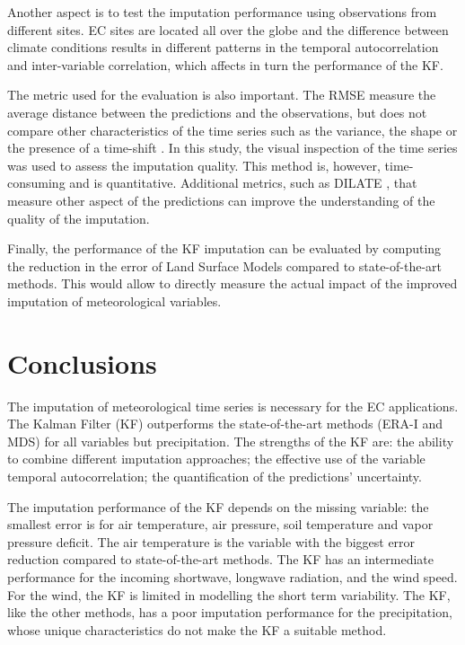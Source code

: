 \documentclass{article}
\let\Oldsection\section
\renewcommand{\section}{\FloatBarrier\Oldsection}
\begin{document}
Another aspect is to test the imputation performance using observations from different sites. EC sites are located all over the globe \cite{pastorello_fluxnet2015_2020} and the difference between climate conditions results in different patterns in the temporal autocorrelation and inter-variable correlation, which affects in turn the performance of the KF.

The metric used for the evaluation is also important. The RMSE measure the average distance between the predictions and the observations, but does not compare other characteristics of the time series such as the variance, the shape or the presence of a time-shift \cite{guen_shape_nodate}. In this study, the visual inspection of the time series was used to assess the imputation quality. This method is, however, time-consuming and is quantitative. Additional metrics, such as DILATE \cite{guen_shape_nodate}, that measure other aspect of the predictions can improve the understanding of the quality of the imputation.

Finally, the performance of the KF imputation can be evaluated by computing the reduction in the error of Land Surface Models compared to state-of-the-art methods. This would allow to directly measure the actual impact of the improved imputation of meteorological variables.


\section{Conclusions}

The imputation of meteorological time series is necessary for the EC applications. The Kalman Filter (KF) outperforms the state-of-the-art methods (ERA-I and MDS) for all variables but precipitation. The strengths of the KF are: the ability to combine different imputation approaches; the effective use of the variable temporal autocorrelation; the quantification of the predictions' uncertainty.

The imputation performance of the KF depends on the missing variable: the smallest error is for air temperature, air pressure, soil temperature and vapor pressure deficit. The air temperature is the variable with the biggest error reduction compared to state-of-the-art methods. The KF has an intermediate performance for the incoming shortwave, longwave radiation, and the wind speed. For the wind, the KF is limited in modelling the short term variability. The KF, like the other methods, has a poor imputation performance for the precipitation, whose unique characteristics do not make the KF a suitable method.
\end{document}
